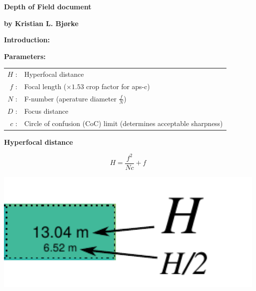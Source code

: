 \documentclass[aspectratio=169]{beamer}
\begin{document}

\begin{frame}[plain]{}
  \vspace{3ex}
  \begin{center} \Huge \bf
    Depth of Field document
  \end{center}
  \begin{center} \Large \bf
    by Kristian L. Bjørke
  \end{center}

  {\large \bf
    Introduction:
  }

  {\large \bf
    Parameters:
  }

  {
    \small
    \begin{table}
      \centering
      \begin{tabular}{r l}
        $H$ : & Hyperfocal distance \\
        $f$ : & Focal length ($\times 1.53$ crop factor for aps-c) \\
        $N$ : & F-number (aperature diameter $\frac{f}{N}$) \\
        $D$ : & Focus distance \\ 
        $c$ : & Circle of confusion (CoC) limit (determines acceptable sharpness)
      \end{tabular}
    \end{table}
  }
\end{frame}


\begin{frame}[plain]{}
  \vspace{3ex}
  \begin{center} \LARGE \bf
    Hyperfocal distance
  \end{center}

  { \Large
    $$\mathit{H = \frac{f^2}{Nc} + f}$$
  }

  \includegraphics[center,width=1.00\textwidth]{img/hyperfocal-distance-example-cell.pdf}


\end{frame}
\end{document}
